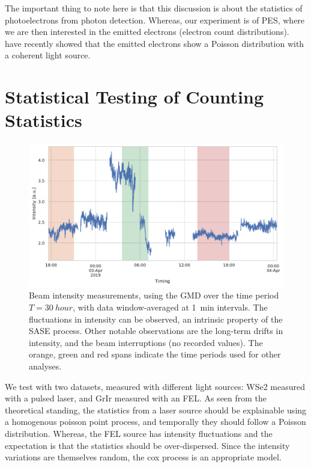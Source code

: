 The important thing to note here is that this discussion is about the statistics of photoelectrons from photon detection. Whereas, our experiment is of \gls{PES}, where we are then interested in the emitted electrons (electron count distributions). \citeauthor{heimerlMultiphotonElectronEmission2024} \cite{heimerlMultiphotonElectronEmission2024} have recently showed that the emitted electrons show a Poisson distribution with a coherent light source. 

\section{Statistical Testing of Counting Statistics}

\begin{figure}
    \centering
    \includegraphics[width=1\linewidth]{images/gmd_grir.pdf}
    \caption{Beam intensity measurements, using the \gls{GMD} over the time period $T=\qty{30}{hour}$, with data window-averaged at \qty{1}{min} intervals. The fluctuations in intensity can be observed, an intrinsic property of the \gls{SASE} process. Other notable observations are the long-term drifts in intensity, and the beam interruptions (no recorded values). The orange, green and red spans indicate the time periods used for other analyses.}
    \label{fig:gmd-intensity}
\end{figure}

We test with two datasets, measured with different light sources: \gls{WSe2} measured with a pulsed laser, and \gls{GrIr} measured with an \gls{FEL}. As seen from the theoretical standing, the statistics from a laser source should be explainable using a homogenous poisson point process, and temporally they should follow a Poisson distribution.
Whereas, the \gls{FEL} source has intensity fluctuations and the expectation is that the statistics should be over-dispersed. Since the intensity variations are themselves random, the cox process is an appropriate model.

